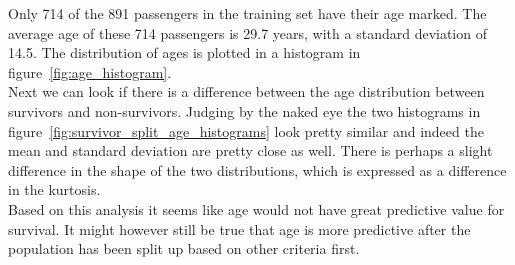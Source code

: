 \documentclass[english, a4paper]{article}
\begin{document}
\noindent
Only 714 of the 891 passengers in the training set have their age marked. The average age of these 714 passengers is 29.7 years, with a standard deviation of 14.5. The distribution of ages is plotted in a histogram in figure~\ref{fig:age_histogram}.\\
Next we can look if there is a difference between the age distribution between survivors and non-survivors. Judging by the naked eye the two histograms in figure~\ref{fig:survivor_split_age_histograms} look pretty similar and indeed the mean and standard deviation are pretty close as well. There is perhaps a slight difference in the shape of the two distributions, which is expressed as a difference in the kurtosis.\\
Based on this analysis it seems like age would not have great predictive value for survival. It might however still be true that age is more predictive after the population has been split up based on other criteria first.
\end{document}
